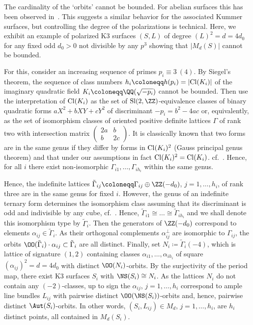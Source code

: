 \subsection{}\label{sec:unbound}
The cardinality of the `orbits' cannot be bounded. For abelian surfaces this has been observed in~\cite{Hay,La2}. This suggests a similar behavior for the associated Kummer surfaces, but controlling the degree of the polarizations is technical. Here, we exhibit an example of polarized K3 surfaces $(S,L)$ of degree $(L)^2=d=4d_0$ for any fixed odd $d_0>0$ not divisible by any $p^3$ showing that $|M_{d}(S)|$ cannot be bounded.

For this, consider an increasing sequence of primes $p_i\equiv 3\ (4)$. By Siegel's theorem, the sequence of class numbers $h_i\coloneqq h(p_i)=|{\rm Cl}(K_i)|$ of the imaginary quadratic field $K_i\coloneqq\QQ(\sqrt{-p_i})$ cannot be bounded. Then use the interpretation of ${\rm Cl}(K_i)$ as the set of ${\rm Sl}(2,\ZZ)$-equivalence classes of binary quadratic forms $aX^2+bXY+cY^2$ of discriminant $-p_i=b^2-4ac$ or, equivalently, as the set of isomorphism classes of oriented positive definite lattices $\Gamma$ of rank two with intersection matrix $\left(\begin{smallmatrix}2a&b\\b&2c\end{smallmatrix}\right)$. It is classically known that two forms are in the same genus if they differ by forms in ${\rm Cl}(K_i)^2$ (Gauss principal genus theorem) and that under our assumptions in fact ${\rm Cl}(K_i)^2={\rm Cl}(K_i)$. cf.~\cite[Proposition~3.11]{Cox}. Hence, for all $i$ there exist non-isomorphic $\Gamma_{i1},\dots,\Gamma_{ih_i}$ within the same genus.

Hence, the indefinite lattices $\tilde\Gamma_{ij}\coloneqq\Gamma_{ij}\oplus\ZZ(-d_0)$, $j=1,\dots,h_i$, of rank three are in the same genus for fixed $i$. However, the genus of an indefinite ternary form determines the isomorphism class assuming that its discriminant is odd and indivisible by any cube, cf.~\cite[Chapter~15, Theorem~21]{Conway}. Hence, $\tilde\Gamma_{i1}\cong\dots\cong\tilde\Gamma_{ih_i}$ and we shall denote this isomorphism type by $\tilde\Gamma_i$. Then the generators of $\ZZ(-d_0)$ correspond to elements $\alpha_{ij}\in\tilde\Gamma_i$. As their orthogonal complements $\alpha_{ij}^\perp$ are isomorphic to $\Gamma_{ij}$, the orbits $\OO(\tilde\Gamma_i)\cdot\alpha_{ij}\subset\tilde\Gamma_i$ are all distinct. Finally, set $N_i\coloneqq \tilde\Gamma_i(-4)$, which is lattice of signature $(1,2)$ containing classes $\alpha_{i1},\dots,\alpha_{ih_i}$ of square $(\alpha_{ij})^2=d=4 d_0$ with distinct $\OO(N_i)$-orbits. By the surjectivity of the period map, there exist K3 surfaces $S_i$ with $\NS(S_i)\cong N_i$. As the lattices $N_i$ do not contain any $(-2)$-classes, up to sign the $\alpha_{ij}$, $j=1,\dots,h_i$ correspond to ample line bundles $L_{ij}$ with pairwise distinct $\OO(\NS(S_i))$-orbits and, hence, pairwise distinct $\Aut(S_i)$-orbits. In other words, $(S_i,L_{ij})\in M_{d}$, $j=1,\dots,h_i$, are $h_i$ distinct points, all contained in $M_{d}(S_i)$.


